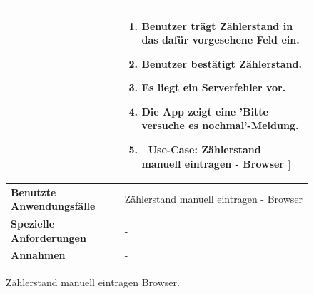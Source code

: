 \begin{figure}[h]
	\centering
	\begin{tabularx}{\textwidth}{ X | X }
		&
		\begin{enumerate}
			\item Benutzer trägt Zählerstand in das dafür vorgesehene Feld ein.
			\item Benutzer bestätigt Zählerstand.
			\item Es liegt ein Serverfehler vor.
			\item Die App zeigt eine 'Bitte versuche es nochmal'-Meldung.
			\item $\lbrack$ Use-Case: Zählerstand manuell eintragen - Browser $\rbrack$
		\end{enumerate} \\ \hline
		\textbf{Benutzte Anwendungsfälle} & Zählerstand manuell eintragen - Browser \\ \hline
		\textbf{Spezielle Anforderungen} & - \\ \hline
		\textbf{Annahmen} & -
	\end{tabularx}
	\caption{Zählerstand manuell eintragen Browser.}
	\label{fig:anwendungsfall-server-tabelle-xx-1}
\end{figure}

